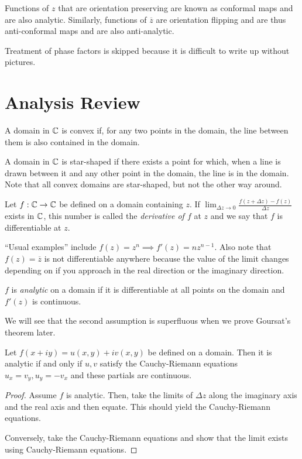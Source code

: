\documentclass[11pt,leqno,oneside]{amsart}
\numberwithin{thm}{section}
\begin{document}
\begin{defn}
    Functions of $z$ that are orientation preserving are known as conformal
    maps and are also analytic. Similarly, functions of $\overline{z}$ are
    orientation flipping and are thus anti-conformal maps and are also
    anti-analytic.
\end{defn}

Treatment of phase factors is skipped because it is difficult to write up
without pictures.

\section*{Analysis Review}

\begin{defn}
A domain in ${\mathbb C}$ is convex if, for any two points in the domain, the line
between them is also contained in the domain.
\end{defn}
\begin{defn}
    A domain in ${\mathbb C}$ is star-shaped if there exists a point for which, when a
    line is drawn between it and any other point in the domain, the line is in
    the domain. Note that all convex domains are star-shaped, but not the other
    way around.
\end{defn}
\begin{defn}
    Let $f: {\mathbb C} \to {\mathbb C}$ be defined on a domain containing $z$. If $\lim_{\Delta
    z \to 0} \frac{f(z+\Delta z) - f(z)}{\Delta z}$ exists in ${\mathbb C}$, this number
    is called the \emph{derivative of $f$} at $z$ and we say that $f$ is
    differentiable at $z$.
\end{defn}

``Usual examples'' include $f(z) = z^n \implies f'(z) = nz^{n-1}$. Also note
that $f(z) = \overline{z}$ is not differentiable anywhere because the value of
the limit changes depending on if you approach in the real direction or the
imaginary direction.
\begin{defn}
    $f$ is \emph{analytic} on a domain if it is differentiable at all points on
    the domain and $f'(z)$ is continuous.
\end{defn}
We will see that the second assumption is superfluous when we prove Goursat's
theorem later.

\begin{thm}
    Let $f(x+iy) = u(x,y)+iv(x,y)$ be defined on a domain. Then it is analytic
    if and only if $u,v$ satisfy the Cauchy-Riemann equations $u_x = v_y, u_y =
    -v_x$ and these partials are continuous.
\end{thm}
\begin{proof}
    Assume $f$ is analytic. Then, take the limits of $\Delta z$ along the
    imaginary axis and the real axis and then equate. This should yield the
    Cauchy-Riemann equations.

    Conversely, take the Cauchy-Riemann equations and show that the limit
    exists using Cauchy-Riemann equations.
\end{proof}
\end{document}
